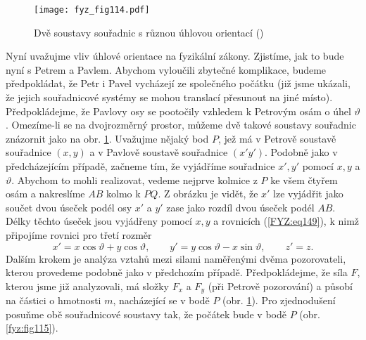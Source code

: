 {    \begin{figure}[ht!]  %
      \centering
      \texttt{[image: fyz\_fig114.pdf]}
      \caption{Dvě soustavy souřadnic s různou úhlovou orientací
              (\cite[s.~156]{Feynman01})}
      \label{fyz:fig114}
    \end{figure}
    Nyní uvažujme vliv úhlové orientace na fyzikální zákony. Zjistíme, jak to bude nyní s Petrem a 
    Pavlem. Abychom vyloučili zbytečné komplikace, budeme předpokládat, že Petr i Pavel vycházejí 
    ze společného počátku (již jsme ukázali, že jejich souřadnicové systémy se mohou translací 
    přesunout na jiné místo). Předpokládejme, že Pavlovy osy se pootočily vzhledem k Petrovým osám 
    o úhel \(\vartheta\). Omezíme-li se na dvojrozměrný prostor, můžeme dvě takové soustavy 
    souřadnic znázornit jako na obr. \ref{fyz:fig114}. Uvažujme nějaký bod \(P\), jež má v Petrově 
    soustavě souřadnice \((x, y)\) a v Pavlově soustavě souřadnice \((x' y')\). Podobně jako v 
    předcházejícím případě, začneme tím, že vyjádříme souřadnice \(x', y'\) pomocí \(x, y\) a 
    \(\vartheta\). Abychom to mohli realizovat, vedeme nejprve kolmice z \(P\) ke všem čtyřem osám 
    a nakreslíme \(AB\) kolmo k \(PQ\). Z obrázku je vidět, že \(x'\) lze vyjádřit jako součet dvou 
    úseček podél osy \(x'\) a \(y'\) zase jako rozdíl dvou úseček podél \(AB\). Délky těchto úseček 
    jsou vyjádřeny pomocí \(x, y\) a rovnicích (\ref{FYZ:eq149}), k nimž připojíme rovnici pro 
    třetí rozměr
    \begin{equation}\label{FYZ:eq149}
      x' = x\cos\vartheta + y\cos\vartheta, \qquad
      y' = y\cos\vartheta - x\sin\vartheta, \qquad
      z' = z.
    \end{equation}
    Dalším krokem je analýza vztahů mezi silami naměřenými dvěma pozorovateli, kterou provedeme 
    podobně jako v předchozím případě. Předpokládejme, že síla \(F\), kterou jsme již analyzovali, 
    má složky \(F_x\) a \(F_y\) (při Petrově pozorování) a působí na částici o hmotnosti \(m\), 
    nacházející se v bodě \(P\) (obr. \ref{fyz:fig114}). Pro zjednodušení posuňme obě souřadnicové 
    soustavy tak, že počátek bude v bodě \(P\) (obr. \ref{fyz:fig115}).
    
}
